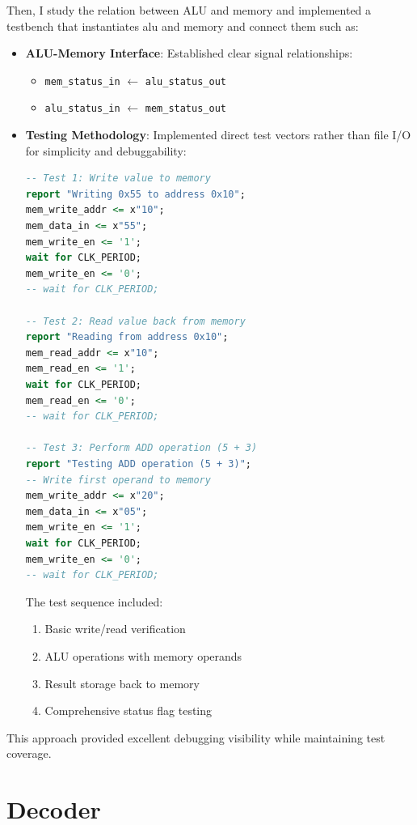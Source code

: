 Then, I study the relation between ALU and memory and implemented a testbench
that instantiates alu and memory and connect them such as:
\begin{itemize}
    \item \textbf{ALU-Memory Interface}:
    Established clear signal relationships:
    \begin{itemize}
        \item \texttt{mem\_status\_in} $\leftarrow$ \texttt{alu\_status\_out}
        \item \texttt{alu\_status\_in} $\leftarrow$ \texttt{mem\_status\_out}
    \end{itemize}

    \item \textbf{Testing Methodology}:
    Implemented direct test vectors rather than file I/O for simplicity and debuggability:
    \begin{lstlisting}[language=VHDL, caption={Testbench combining ALU and memory}]
-- Test 1: Write value to memory
report "Writing 0x55 to address 0x10";
mem_write_addr <= x"10";
mem_data_in <= x"55";
mem_write_en <= '1';
wait for CLK_PERIOD;
mem_write_en <= '0';
-- wait for CLK_PERIOD;

-- Test 2: Read value back from memory
report "Reading from address 0x10";
mem_read_addr <= x"10";
mem_read_en <= '1';
wait for CLK_PERIOD;
mem_read_en <= '0';
-- wait for CLK_PERIOD;

-- Test 3: Perform ADD operation (5 + 3)
report "Testing ADD operation (5 + 3)";
-- Write first operand to memory
mem_write_addr <= x"20";
mem_data_in <= x"05";
mem_write_en <= '1';
wait for CLK_PERIOD;
mem_write_en <= '0';
-- wait for CLK_PERIOD;
    \end{lstlisting}

    The test sequence included:
    \begin{enumerate}
        \item Basic write/read verification
        \item ALU operations with memory operands
        \item Result storage back to memory
        \item Comprehensive status flag testing
    \end{enumerate}
\end{itemize}

This approach provided excellent debugging visibility while maintaining test coverage.

\section{Decoder}

